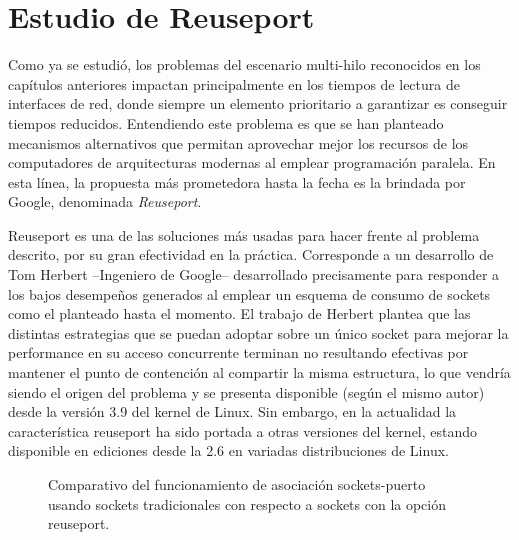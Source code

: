 \chapter{Estudio de Reuseport}

Como ya se estudió, los problemas del escenario multi-hilo reconocidos en los capítulos anteriores impactan principalmente en los tiempos de lectura de interfaces de red, donde siempre un elemento prioritario a garantizar es conseguir tiempos reducidos. Entendiendo este problema es que se han planteado mecanismos alternativos que permitan aprovechar mejor los recursos de los computadores de arquitecturas modernas al emplear programación paralela. En esta línea, la propuesta más prometedora hasta la fecha es la brindada por Google, denominada \emph{Reuseport}.

Reuseport \cite{slides:googleReuseport} es una de las soluciones más usadas para hacer frente al problema descrito, por su gran efectividad en la práctica. Corresponde a un desarrollo de Tom Herbert --Ingeniero de Google-- desarrollado precisamente para responder a los bajos desempeños generados al emplear un esquema de consumo de sockets como el planteado hasta el momento. El trabajo de Herbert plantea que las distintas estrategias que se puedan adoptar sobre un único socket para mejorar la performance en su acceso concurrente terminan no resultando efectivas por mantener el punto de contención al compartir la misma estructura, lo que vendría siendo el origen del problema y se presenta disponible (según el mismo autor) desde la versión 3.9 del kernel de Linux. Sin embargo, en la actualidad la característica reuseport ha sido portada a otras versiones del kernel, estando disponible en ediciones desde la 2.6 en variadas distribuciones de Linux.

\begin{figure}[h!]
	\centering
	\hspace*{\fill}
	\hfill
	\caption{Comparativo del funcionamiento de asociación sockets-puerto usando sockets tradicionales con respecto a sockets con la opción reuseport.}
	\label{fig:socketDiffereces}
	\hspace*{\fill}
\end{figure}

